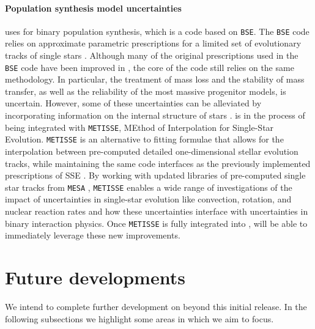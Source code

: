 \documentclass[twocolumn, twocolappendix, oneside]{aastex631}
\begin{document}
\paragraph{Population synthesis model uncertainties} \cogsworth uses \cosmic for binary population synthesis, which is a code based on \texttt{BSE}. The \texttt{BSE} code relies on approximate parametric prescriptions for a limited set of evolutionary tracks of single stars \citep{pols:98, Hurley+2000:2000MNRAS.315..543H,Hurley+2002}. Although many of the original prescriptions used in the \texttt{BSE} code have been improved in \cosmic \citep{COSMIC}, the core of the code still relies on the same methodology. In particular, the treatment of mass loss and the stability of mass transfer, as well as the reliability of the most massive progenitor models, is uncertain.
However, some of these uncertainties can be alleviated by incorporating information on the internal structure of stars \citep[e.g.,][]{Kruckow+2018:2018MNRAS.481.1908K, Fragos+2023:2023ApJS..264...45F}. \cosmic is in the process of being integrated with \texttt{METISSE}, MEthod of Interpolation for Single-Star Evolution. \texttt{METISSE} is an alternative to fitting formulae that allows for the interpolation between pre-computed detailed one-dimensional stellar evolution tracks, while maintaining the same code interfaces as the previously implemented prescriptions of SSE \citep{Agrawal+2020:2020MNRAS.497.4549A, Agrawal+2023}.
By working with updated libraries of pre-computed single star tracks from \texttt{MESA} \citep{Paxton2011, Paxton2013, Paxton2015, Paxton2018, Paxton2019, Jermyn2023}, \texttt{METISSE} enables a wide range of investigations of the impact of uncertainties in single-star evolution like convection, rotation, and nuclear reaction rates and how these uncertainties interface with uncertainties in binary interaction physics. Once \texttt{METISSE} is fully integrated into \cosmic, \cogsworth will be able to immediately leverage these new improvements.

\section{Future developments}\label{sec:future}

We intend to complete further development on \cogsworth beyond this initial release. In the following subsections we highlight some areas in which we aim to focus.
\end{document}
